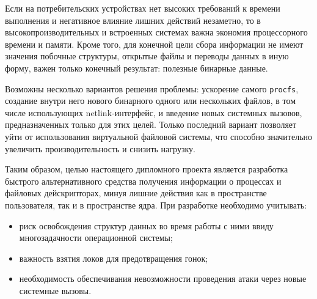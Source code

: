 Если на потребительских устройствах нет высоких требований к времени выполнения
и негативное влияние лишних действий незаметно, то в высокопроизводительных и
встроенных системах важна экономия процессорного времени и памяти. Кроме того,
для конечной цели сбора информации не имеют значения побочные структуры,
открытые файлы и переводы данных в иную форму, важен только конечный результат:
полезные бинарные данные.

Возможны несколько вариантов решения проблемы: ускорение самого \texttt{procfs},
создание внутри него нового бинарного одного или нескольких файлов, в том числе
использующих netlink-интерфейс, и введение новых системных вызовов,
предназначенных только для этих целей. Только последний вариант позволяет уйти
от использования виртуальной файловой системы, что способно значительно
увеличить производительность и снизить нагрузку.

Таким образом, целью настоящего дипломного проекта является разработка быстрого
альтернативного средства получения информации о процессах и файловых
дейскрипторах, минуя лишние действия как в пространстве пользователя, так и в
пространстве ядра. При разработке необходимо учитывать:
\begin{itemize}
\item риск освобождения структур данных во время работы с ними ввиду
  многозадачности операционной системы;
\item важность взятия локов для предотвращения гонок;
\item необходимость обеспечивания невозможности проведения атаки через новые
  системные вызовы.
\end{itemize}
